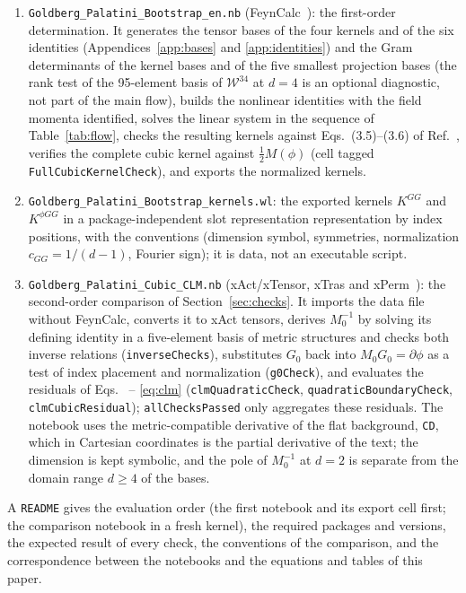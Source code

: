 \documentclass[prd,aps,preprint,superscriptaddress,nofootinbib,amsmath,amssymb,eqsecnum]{revtex4-2}
\newcommand{\W}{\mathcal{W}}
\providecommand{\DIFaddtex}[1]{{\protect\color{blue} \sf #1}} %
\providecommand{\DIFdeltex}[1]{{\protect\color{red} \scriptsize #1}} %
\providecommand{\DIFaddbegin}{} %
\providecommand{\DIFaddend}{} %
\providecommand{\DIFdelbegin}{} %
\providecommand{\DIFdelend}{} %
\providecommand{\DIFadd}[1]{\texorpdfstring{\DIFaddtex{#1}}{#1}} %
\providecommand{\DIFdel}[1]{\texorpdfstring{\DIFdeltex{#1}}{}} %
\begin{document}
\begin{enumerate}
\item \texttt{Goldberg\_Palatini\_Bootstrap\_en.nb} (FeynCalc~\cite{FeynCalc}): the first-order
determination. It generates the tensor bases of the four kernels and of the six identities
(Appendices~\ref{app:bases} and \ref{app:identities}) and the Gram determinants of the kernel
bases and of the five smallest projection bases (the rank test of the 95-element basis of
$\W^{34}$ at $d=4$ is an optional diagnostic, not part of the main flow), builds the
nonlinear identities with the field momenta identified, solves the linear system in the sequence of
Table~\ref{tab:flow}, checks the resulting kernels against Eqs.~(3.5)--(3.6) of
Ref.~\cite{BrandtMcKeon2016}, verifies the complete cubic kernel against $\tfrac12M(\phi)$
(cell tagged \texttt{FullCubicKernelCheck}), and exports the normalized kernels.
\item \texttt{Goldberg\_Palatini\_Bootstrap\_kernels.wl}: the exported kernels $K^{GG}$ and
$K^{\phi GG}$ in a package-independent \DIFdelbegin \DIFdel{slot representation }\DIFdelend \DIFaddbegin \DIFadd{representation by index positions}\DIFaddend , with the conventions
(dimension symbol, symmetries, normalization $c_{GG}=1/(d-1)$, Fourier sign); it is data,
not an executable script.
\item \texttt{Goldberg\_Palatini\_Cubic\_CLM.nb} (xAct/xTensor, xTras and xPerm~\cite{xAct,xPerm,xTras}):
the second-order comparison of Section~\ref{sec:checks}. It imports the data file without
FeynCalc, converts it to xAct tensors, derives $M_0^{-1}$ by solving its defining identity in
a five-element basis of metric structures and checks both inverse relations
(\texttt{inverseChecks}), substitutes $G_0$ back into $M_0G_0=\partial\phi$ as a test of index
placement and normalization (\texttt{g0Check}), and evaluates the residuals of
Eqs.~\DIFdelbegin %
\DIFdel{--}%
\DIFdelend \DIFaddbegin \eqref{eq:clm}
\DIFaddend (\texttt{clmQuadraticCheck}, \texttt{quadraticBoundaryCheck}, \texttt{clmCubicResidual});
\texttt{allChecksPassed} only aggregates these residuals. The notebook uses the
metric-compatible derivative of the flat background, \texttt{CD}, which in Cartesian
coordinates is the partial derivative of the text; the dimension is kept symbolic, and the
pole of $M_0^{-1}$ at $d=2$ is separate from the \DIFdelbegin \DIFdel{domain }\DIFdelend \DIFaddbegin \DIFadd{range }\DIFaddend $d\geq4$ of the bases.
\end{enumerate}
A \texttt{README} gives the evaluation order (the first notebook and its export cell first;
the comparison notebook in a fresh kernel), the required packages and versions, the expected
result of every check, the conventions of the comparison, and the correspondence between the
notebooks and the equations and tables of this paper.
\end{document}
